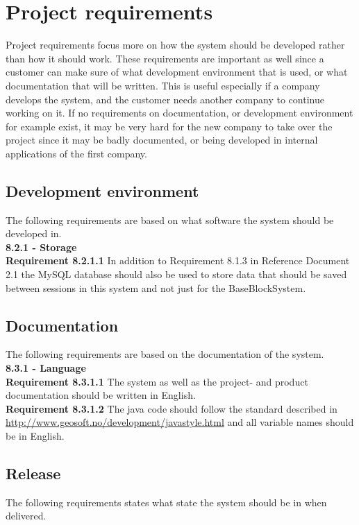 \documentclass{article}
\begin{document}
\section{Project requirements}

Project requirements focus more on how the system should be developed rather than how it should work. These requirements are important as well since a customer can make sure of what development environment that is used, or what documentation that will be written. This is useful especially if a company develops the system, and the customer needs another company to continue working on it. If no requirements on documentation, or development environment for example exist, it may be very hard for the new company to take over the project since it may be badly documented, or being developed in internal applications of the first company.
\setcounter{subsection}{1}
\subsection{Development environment}
The following requirements are based on what software the system should be developed in.\\

{\fontsize{11}{11}\selectfont \noindent\textbf{8.2.1 - Storage}} \\
\noindent\textbf{Requirement 8.2.1.1} In addition to Requirement 8.1.3 in Reference Document 2.1 the MySQL database should also be used to store data that should be saved between sessions in this system and not just for the BaseBlockSystem.

\subsection{Documentation}
The following requirements are based on the documentation of the system.\\

{\fontsize{11}{11}\selectfont \noindent\textbf{8.3.1 - Language}} \\
\noindent\textbf{Requirement 8.3.1.1} %
The system as well as the project- and product documentation should be written in English. \\
\textbf{Requirement 8.3.1.2}
The java code should follow the standard described in \url{http://www.geosoft.no/development/javastyle.html} and all variable names should be in English.
\\
\subsection{Release}
The following requirements states what state the system should be in when delivered.\\
\end{document}
